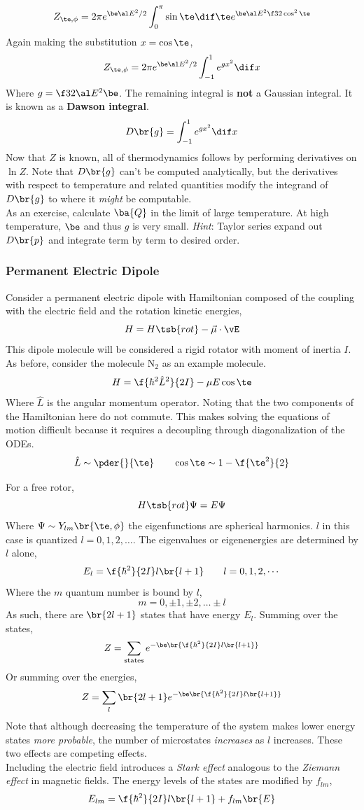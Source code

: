 \documentclass{article}
\begin{document}
\[ Z_{\te,\phi} = 2\pi e^{\be \al E^2 / 2} \int_{0}^{\pi} \sin \te \dif \te e^{\be \al E^2 \f32 \cos^2\te} \]
Again making the substitution $x = \cos \te$,
\[ Z_{\te,\phi} = 2\pi e^{\be \al E^2 / 2} \int_{-1}^{1} e^{g x^2} \dif x \]
Where $g = \f32 \al E^2 \be$. The remaining integral is \textbf{not} a Gaussian integral. It is known as a \textbf{Dawson integral}.
\[ D\br{g} = \int_{-1}^{1} e^{g x^2} \dif x \]
Now that $Z$ is known, all of thermodynamics follows by performing derivatives on $\ln Z$. Note that $D\br{g}$ can't be computed analytically, but the derivatives with respect to temperature and related quantities modify the integrand of $D\br{g}$ to where it \textit{might} be computable. \\

As an exercise, calculate $\ba{Q}$ in the limit of large temperature. At high temperature, $\be$ and thus $g$ is very small. \textit{Hint}: Taylor series expand out $D\br{p}$ and integrate term by term to desired order.

\subsubsection{Permanent Electric Dipole}

Consider a permanent electric dipole with Hamiltonian composed of the coupling with the electric field and the rotation kinetic energies,
\[ H = H\tsb{rot} - \vec{\mu} \cdot \vE \]
This dipole molecule will be considered a rigid rotator with moment of inertia $I$. As before, consider the molecule $\text{N}_2$ as an example molecule.
\[ H = \f{\hbar^2 \hat{L}^2}{2 I} - \mu E \cos \te \]
Where $\hat{L}$ is the angular momentum operator. Noting that the two components of the Hamiltonian here do not commute. This makes solving the equations of motion difficult because it requires a decoupling through diagonalization of the ODEs.
\[ \hat{L} \sim \pder{}{\te} \qquad \cos \te \sim 1 - \f{\te^2}{2} \]

For a free rotor,
\[ H\tsb{rot} \Psi = E \Psi \]
Where $\Psi \sim Y_{lm}\br{\te, \phi}$ the eigenfunctions are spherical harmonics. $l$ in this case is quantized $l = 0, 1, 2,\ldots$. The eigenvalues or eigenenergies are determined by $l$ alone,
\[ E_l = \f{\hbar^2}{2I}l\br{l+1} \qquad l = 0,1,2,\cdots \]
Where the $m$ quantum number is bound by $l$,
\[ m = 0, \pm 1, \pm 2, \ldots \pm l \]
As such, there are $\br{2l+1}$ states that have energy $E_l$. Summing over the states,
\[ Z = \sum_{\text{states}} e^{-\be \br{\f{\hbar^2}{2I}l\br{l+1}}} \]
Or summing over the energies,
\[ Z = \sum_{l} \br{2l + 1} e^{-\be \br{\f{\hbar^2}{2I}l\br{l+1}}} \]
Note that although decreasing the temperature of the system makes lower energy states \textit{more probable}, the number of microstates \textit{increases} as $l$ increases. These two effects are competing effects.\\
Including the electric field introduces a \textit{Stark effect} analogous to the \textit{Ziemann effect} in magnetic fields. The energy levels of the states are modified by $f_{lm}$,
\[ E_{lm} = \f{\hbar^2}{2I} l\br{l+1} + f_{lm}\br{E} \]
\end{document}
